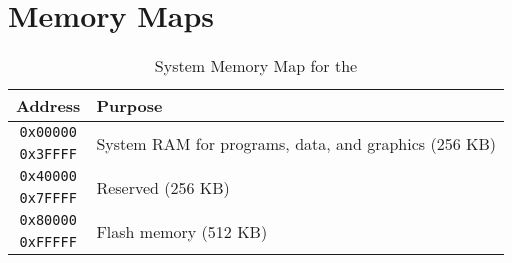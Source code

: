 \chapter{Memory Maps}

\begin{table}[h]
    \begin{center}
        \begin{tabular}{|c|l|} \hline
            Address & Purpose \\ \hline\hline
            \verb+0x00000+ & \multirow{2}{*}{System RAM for programs, data, and graphics (256 KB)} \\ \cline{1-1}
            \verb+0x3FFFF+ & \\ \hline
            \verb+0x40000+ & \multirow{2}{*}{Reserved (256 KB)} \\ \cline{1-1}
            \verb+0x7FFFF+ & \\ \hline
            \verb+0x80000+ & \multirow{2}{*}{Flash memory (512 KB)} \\ \cline{1-1}
            \verb+0xFFFFF+ & \\ \hline
        \end{tabular}
    \end{center}
    \caption{System Memory Map for the \jr}
    \label{tab:sys_mem_map}
\end{table}

